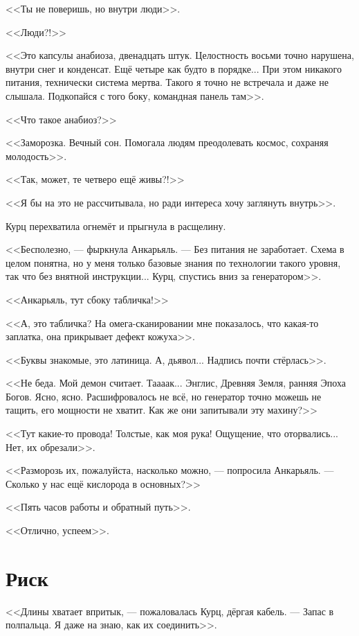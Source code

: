 \documentclass[a4paper,10pt,fleqn]{book}\usepackage{polyglossia}\setdefaultlanguage{english}\setotherlanguage{russian}\defaultfontfeatures{Ligatures=TeX,Mapping=tex-text}\usepackage{xcolor}\definecolor{lightgray}{HTML}{bbbbbb}\color{lightgray}\newcommand{\ml}[3]{\textcolor{black}{#3}}
\begin{document}
<<Ты не поверишь, но внутри люди>>.

<<Люди?!>>

<<Это капсулы анабиоза, двенадцать штук.
Целостность восьми точно нарушена, внутри снег и конденсат.
Ещё четыре как будто в порядке...
При этом никакого питания, технически система мертва.
Такого я точно не встречала и даже не слышала.
Подкопайся с того боку, командная панель там>>.

<<Что такое анабиоз?>>

<<Заморозка.
Вечный сон.
Помогала людям преодолевать космос, сохраняя молодость>>.

<<Так, может, те четверо ещё живы?!>>

<<Я бы на это не рассчитывала, но ради интереса хочу заглянуть внутрь>>.

Курц перехватила огнемёт и прыгнула в расщелину.

<<Бесполезно, --- фыркнула Анкарьяль.
--- Без питания не заработает.
Схема в целом понятна, но у меня только базовые знания по технологии такого уровня, так что без внятной инструкции...
Курц, спустись вниз за генератором>>.

<<Анкарьяль, тут сбоку табличка!>>

<<А, это табличка?
На омега-сканировании мне показалось, что какая-то заплатка, она прикрывает дефект кожуха>>.

<<Буквы знакомые, это латиница.
А, дьявол...
Надпись почти стёрлась>>.

<<Не беда.
Мой демон считает.
Таааак...
Энглис, Древняя Земля, ранняя Эпоха Богов.
Ясно, ясно.
Расшифровалось не всё, но генератор точно можешь не тащить, его мощности не хватит.
Как же они запитывали эту махину?>>

<<Тут какие-то провода!
Толстые, как моя рука!
Ощущение, что оторвались...
Нет, их обрезали>>.

<<Разморозь их, пожалуйста, насколько можно, --- попросила Анкарьяль.
--- Сколько у нас ещё кислорода в основных?>>

<<Пять часов работы и обратный путь>>.

<<Отлично, успеем>>.

\section{Риск}

<<Длины хватает впритык, --- пожаловалась Курц, дёргая кабель.
--- Запас в полпальца.
Я даже на знаю, как их соединить>>.
\end{document}
